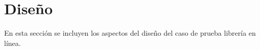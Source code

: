 %
%

\section{Diseño}
En esta sección se incluyen los aspectos del diseño del caso de prueba
librería en línea.
